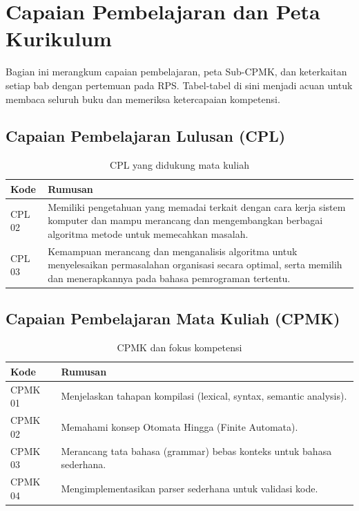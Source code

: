 \chapter*{Capaian Pembelajaran dan Peta Kurikulum}

Bagian ini merangkum capaian pembelajaran, peta Sub-CPMK, dan
keterkaitan setiap bab dengan pertemuan pada RPS. Tabel-tabel di sini
menjadi acuan untuk membaca seluruh buku dan memeriksa ketercapaian
kompetensi.

\section*{Capaian Pembelajaran Lulusan (CPL)}

\begin{table}[H]
\centering
\caption{CPL yang didukung mata kuliah}
\label{tab:cpl}
\begin{tabularx}{\textwidth}{@{}lX@{}}
\toprule
\textbf{Kode} & \textbf{Rumusan} \\
\midrule
CPL 02 & Memiliki pengetahuan yang memadai terkait dengan cara kerja
sistem komputer dan mampu merancang dan mengembangkan berbagai
algoritma metode untuk memecahkan masalah. \\
CPL 03 & Kemampuan merancang dan menganalisis algoritma untuk
menyelesaikan permasalahan organisasi secara optimal, serta memilih
dan menerapkannya pada bahasa pemrograman tertentu. \\
\bottomrule
\end{tabularx}
\end{table}

\section*{Capaian Pembelajaran Mata Kuliah (CPMK)}

\begin{table}[H]
\centering
\caption{CPMK dan fokus kompetensi}
\label{tab:cpmk}
\begin{tabularx}{\textwidth}{@{}lX@{}}
\toprule
\textbf{Kode} & \textbf{Rumusan} \\
\midrule
CPMK 01 & Menjelaskan tahapan kompilasi (lexical, syntax, semantic
analysis). \\
CPMK 02 & Memahami konsep Otomata Hingga (Finite Automata). \\
CPMK 03 & Merancang tata bahasa (grammar) bebas konteks untuk bahasa
sederhana. \\
CPMK 04 & Mengimplementasikan parser sederhana untuk validasi kode. \\
\bottomrule
\end{tabularx}
\end{table}

